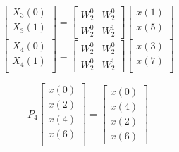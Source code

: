 \documentclass[journal,12pt,twocolumn]{IEEEtran}
\renewcommand\thesection{\arabic{section}}
\begin{document}
\begin{enumerate}[label=\thesection.\arabic*.,ref=\thesection.\theenumi]
\begin{equation}
\begin{bmatrix}
X_{3}(0) \\ 
X_{3}(1)\\ 
\end{bmatrix}
= 
\begin{bmatrix}
W^{0}_{2}&W^{0}_{2}\\
W^{0}_{2}&W^{1}_{2}
\end{bmatrix}
\begin{bmatrix}
x(1) \\ 
x(5) \\ 
\end{bmatrix}
\end{equation}
\begin{equation}
\begin{bmatrix}
X_{4}(0) \\ 
X_{4}(1)\\ 
\end{bmatrix}
= 
\begin{bmatrix}
W^{0}_{2}&W^{0}_{2}\\
W^{0}_{2}&W^{1}_{2}
\end{bmatrix}
\begin{bmatrix}
x(3) \\ 
x(7) \\ 
\end{bmatrix}
\end{equation}


\begin{equation}
P_{4}
\begin{bmatrix}
x(0) \\ 
x(2) \\ 
x(4) \\ 
x(6) \\
\end{bmatrix}
 = 
\begin{bmatrix}
x(0) \\ 
x(4) \\ 
x(2) \\
x(6)
\end{bmatrix}
\end{equation}


\end{enumerate}
\end{document}

